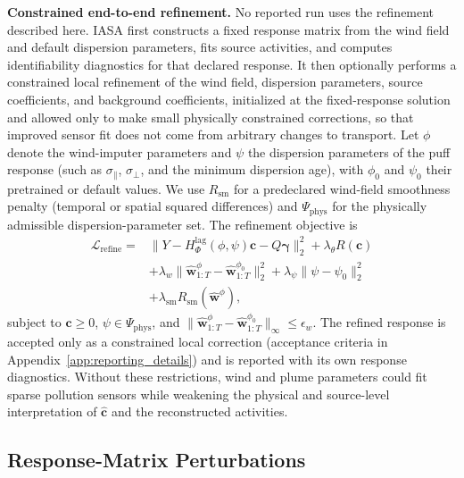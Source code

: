 \noindent\textbf{Constrained end-to-end refinement.}
No reported run uses the refinement described here.  IASA first constructs a fixed
response matrix from the wind field and
default dispersion parameters, fits source activities, and computes
identifiability diagnostics for that declared response.  It then optionally
performs a constrained local refinement of the wind field, dispersion
parameters, source coefficients, and background coefficients, initialized at the
fixed-response solution and allowed only to make small physically constrained
corrections, so that improved sensor fit does not come from arbitrary changes to
transport.  Let \(\phi\) denote the wind-imputer parameters and \(\psi\) the
dispersion parameters of the puff response (such as \(\sigma_\parallel\),
\(\sigma_\perp\), and the minimum dispersion age), with \(\phi_0\) and \(\psi_0\)
their pretrained or default values.  We use \(R_{\mathrm{sm}}\) for a predeclared
wind-field smoothness penalty (temporal or spatial squared differences) and
\(\Psi_{\mathrm{phys}}\) for the physically admissible dispersion-parameter set.
The refinement objective is
\begin{align}
\mathcal L_{\mathrm{refine}}
=&\|Y-H_{\Phi}^{\mathrm{lag}}(\phi,\psi)\mathbf c-Q\boldsymbol\gamma\|_2^2
+\lambda_\theta R(\mathbf c) \nonumber\\
&+\lambda_w\|\widehat{\mathbf w}_{1:T}^{\phi}-\widehat{\mathbf w}_{1:T}^{\phi_0}\|_2^2
+\lambda_\psi\|\psi-\psi_0\|_2^2 \nonumber\\
&+\lambda_{\mathrm{sm}}R_{\mathrm{sm}}(\widehat{\mathbf w}^{\phi}),
\label{eq:refinement_objective}
\end{align}
subject to \(\mathbf c\ge 0\), \(\psi\in\Psi_{\mathrm{phys}}\), and
\(\|\widehat{\mathbf w}_{1:T}^{\phi}-\widehat{\mathbf w}_{1:T}^{\phi_0}\|_\infty
\le \epsilon_w\).  The refined response is accepted only as a constrained local
correction (acceptance criteria in Appendix~\ref{app:reporting_details}) and is
reported with its own response diagnostics.  Without these restrictions, wind and
plume parameters could fit sparse pollution sensors while weakening the physical
and source-level interpretation of \(\widehat{\mathbf c}\) and the reconstructed
activities.


\subsection{Response-Matrix Perturbations}
\label{app:operator_error_details}

